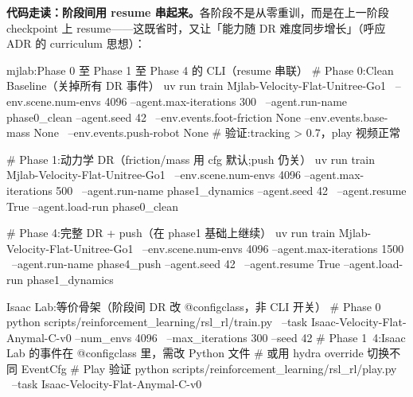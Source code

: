 \textbf{代码走读：阶段间用 resume 串起来。}各阶段不是从零重训，而是在上一阶段 checkpoint 上 resume——这既省时，又让「能力随 DR 难度同步增长」（呼应 ADR 的 curriculum 思想）：

\begin{codebox}[bash]{mjlab:Phase 0 至 Phase 1 至 Phase 4 的 CLI（resume 串联）}
# Phase 0:Clean Baseline（关掉所有 DR 事件）
uv run train Mjlab-Velocity-Flat-Unitree-Go1 \
  --env.scene.num-envs 4096 --agent.max-iterations 300 \
  --agent.run-name phase0_clean --agent.seed 42 \
  --env.events.foot-friction None --env.events.base-mass None \
  --env.events.push-robot None
# 验证:tracking > 0.7，play 视频正常

# Phase 1:动力学 DR（friction/mass 用 cfg 默认;push 仍关）
uv run train Mjlab-Velocity-Flat-Unitree-Go1 \
  --env.scene.num-envs 4096 --agent.max-iterations 500 \
  --agent.run-name phase1_dynamics --agent.seed 42 \
  --agent.resume True --agent.load-run phase0_clean

# Phase 4:完整 DR + push（在 phase1 基础上继续）
uv run train Mjlab-Velocity-Flat-Unitree-Go1 \
  --env.scene.num-envs 4096 --agent.max-iterations 1500 \
  --agent.run-name phase4_push --agent.seed 42 \
  --agent.resume True --agent.load-run phase1_dynamics
\end{codebox}

\begin{codebox}[bash]{Isaac Lab:等价骨架（阶段间 DR 改 @configclass，非 CLI 开关）}
# Phase 0
python scripts/reinforcement_learning/rsl_rl/train.py \
  --task Isaac-Velocity-Flat-Anymal-C-v0 --num_envs 4096 \
  --max_iterations 300 --seed 42
# Phase 1~4:Isaac Lab 的事件在 @configclass 里，需改 Python 文件
#            或用 hydra override 切换不同 EventCfg
# Play 验证
python scripts/reinforcement_learning/rsl_rl/play.py \
  --task Isaac-Velocity-Flat-Anymal-C-v0
\end{codebox}

